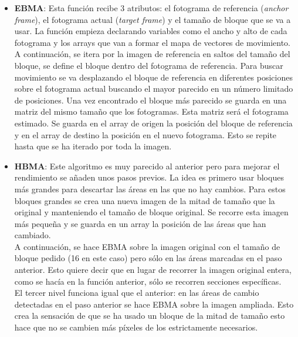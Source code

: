 \documentclass[a4paper,12pt]{report}
\begin{document}
\begin{itemize}
	\item \textbf{EBMA}: Esta función recibe 3 atributos: el fotograma de referencia (\emph{anchor frame}), el fotograma actual (\emph{target frame}) y el tamaño de bloque que se va a usar. La función empieza declarando variables como el ancho y alto de cada fotograma y los arrays que van a formar el mapa de vectores de movimiento.\\
 
A continuación, se itera por la imagen de referencia en saltos del tamaño del bloque, se define el bloque dentro del fotograma de referencia. Para buscar movimiento se va desplazando el bloque de referencia en diferentes posiciones sobre el fotograma actual buscando el mayor parecido en un número limitado de posiciones. Una vez encontrado el bloque más parecido se guarda en una matriz del mismo tamaño que los fotogramas. Esta matriz será el fotograma estimado. Se guarda en el array de origen la posición del bloque de referencia y en el array de destino la posición en el nuevo fotograma. Esto se repite hasta que se ha iterado por toda la imagen.\\

	\item \textbf{HBMA}: Este algoritmo es muy parecido al anterior pero para mejorar el rendimiento se añaden unos pasos previos. La idea es primero usar bloques más grandes para descartar las áreas en las que no hay cambios. Para estos bloques grandes se crea una nueva imagen de la mitad de tamaño que la original y manteniendo el tamaño de bloque original. Se recorre esta imagen más pequeña y se guarda en un array la posición de las áreas que han cambiado.\\

A continuación, se hace EBMA sobre la imagen original con el tamaño de bloque pedido (16 en este caso) pero sólo en las áreas marcadas en el paso anterior. Esto quiere decir que en lugar de recorrer la imagen original entera, como se hacía en la función anterior, sólo se recorren secciones específicas.\\

El tercer nivel funciona igual que el anterior: en las áreas de cambio detectadas en el paso anterior se hace EBMA sobre la imagen ampliada. Esto crea la sensación de que se ha usado un bloque de la mitad de tamaño esto hace que no se cambien más píxeles de los estrictamente necesarios.\\


\end{itemize}
\end{document}
